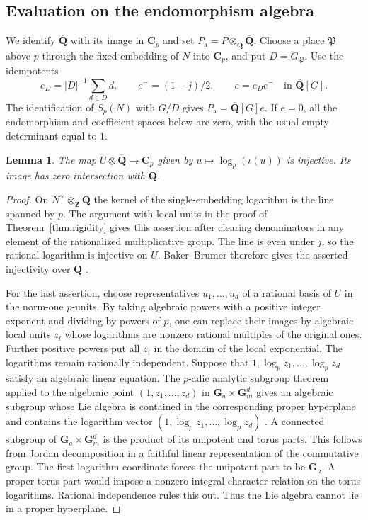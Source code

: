 \documentclass[11pt]{amsart}
\numberwithin{equation}{section}
\newtheorem{lemma}[theorem]{Lemma}
\theoremstyle{definition}
\theoremstyle{remark}
\newcommand{\Q}{\mathbf Q}
\newcommand{\Z}{\mathbf Z}
\newcommand{\Qbar}{\overline{\mathbf Q}}
\newcommand{\Cp}{\mathbf C_p}
\newcommand{\Gm}{\mathbf G_m}
\newcommand{\Ga}{\mathbf G_a}
\begin{document}
\subsection{Evaluation on the endomorphism algebra}

We identify $\Qbar$ with its image in $\Cp$ and set
$P_{\mathrm a}=P\otimes_\Q\Qbar$. Choose a place
$\mathfrak P$ above $p$ through the fixed embedding of $N$
into $\Cp$, and put $D=G_{\mathfrak P}$. Use the idempotents
\[
 e_D=|D|^{-1}\sum_{d\in D}d,\qquad e^-=(1-j)/2,\qquad
 e=e_D e^- \quad\text{in }\Qbar[G].
\]
The identification of $S_p(N)$ with $G/D$ gives
$P_{\mathrm a}=\Qbar[G]e$. If $e=0$, all the
endomorphism and coefficient spaces below are zero,
with the usual empty determinant equal to $1$.

\begin{lemma}\label{lem:log}
The map $U\otimes\Qbar\to\Cp$ given by $u\mapsto
\log_p(\iota(u))$ is injective. Its image has zero
intersection with $\Qbar$.
\end{lemma}

\begin{proof}
On $N^\times\otimes_\Z\Q$ the kernel of the single-embedding
logarithm is the line spanned by $p$. The argument with local
units in the proof of Theorem~\ref{thm:rigidity} gives
this assertion after clearing denominators in any element
of the rationalized multiplicative group. The line is even
under $j$, so the rational logarithm is injective on $U$.
Baker--Brumer therefore gives the asserted injectivity
over $\Qbar$ \cite{Brumer,Maksoud}.

For the last assertion, choose representatives
$u_1,\ldots,u_d$ of a rational basis of $U$ in the
norm-one $p$-units. By taking algebraic powers with a
positive integer exponent and dividing by powers of $p$,
one can replace their images by algebraic local units
$z_i$ whose logarithms are nonzero rational multiples
of the original ones. Further positive powers put all
$z_i$ in the domain of the local exponential. The
logarithms remain rationally independent. Suppose that
$1,\log_p z_1,\ldots,\log_p z_d$ satisfy an algebraic
linear equation. The $p$-adic analytic subgroup theorem
applied to the algebraic point $(1,z_1,\ldots,z_d)$ in
$\Ga\times\Gm^d$ gives an algebraic subgroup whose Lie
algebra is contained in the corresponding proper
hyperplane and contains the logarithm vector
$(1,\log_p z_1,\ldots,\log_p z_d)$
\cite[Th.~1.1 and \S3.1]{FuchsPham}. A connected subgroup of
$\Ga\times\Gm^d$ is the product of its unipotent and
torus parts. This follows from Jordan decomposition in a
faithful linear representation of the commutative group.
The first logarithm coordinate forces the unipotent
part to be $\Ga$. A proper torus part would impose a
nonzero integral character relation on the torus
logarithms. Rational independence rules this out. Thus
the Lie algebra cannot lie in a proper hyperplane.
\end{proof}
\end{document}
